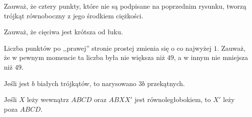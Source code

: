 
\begin{hints_list}
	\item Zauważ, że cztery punkty, które nie są podpisane na poprzednim rysunku, tworzą trójkąt równoboczny z jego środkiem ciężkości.
	\item Zauważ, że cięciwa jest krótsza od łuku.
	\item *
	\item Liczba punktów po ,,prawej'' stronie prostej zmienia się o co najwyżej $1$. Zauważ, że w pewnym momencie ta liczba była nie większa niż $49$, a w innym nie mniejsza niż $49$.
	\item Jeśli jest $b$ białych trójkątów, to narysowano $3b$ przekątnych.
	\item Jeśli $X$ leży wewnątrz $ABCD$ oraz $ABXX'$ jest równoległobokiem, to $X'$ leży poza $ABCD$.
\end{hints_list}